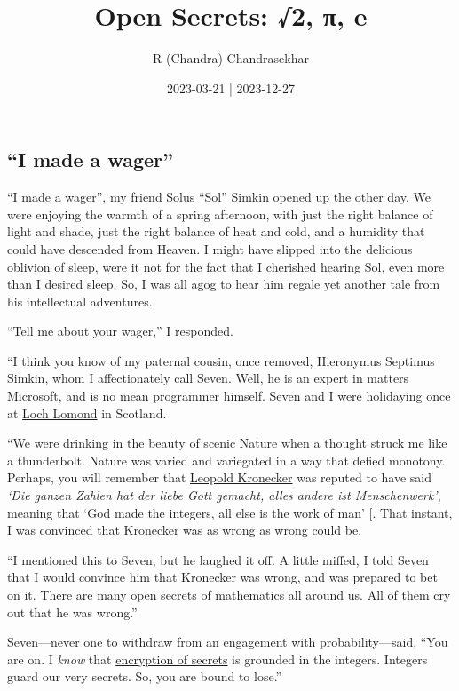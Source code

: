 \documentclass[
  a4paper,
]{article}
\title{Open Secrets: √2, π, e}
\author{R (Chandra) Chandrasekhar}
\date{2023-03-21 | 2023-12-27}
\begin{document}
\maketitle

\thispagestyle{empty}


\subsection{``I made a wager''}\label{i-made-a-wager}

``I made a wager'', my friend Solus ``Sol'' Simkin opened up the other
day. We were enjoying the warmth of a spring afternoon, with just the
right balance of light and shade, just the right balance of heat and
cold, and a humidity that could have descended from Heaven. I might have
slipped into the delicious oblivion of sleep, were it not for the fact
that I cherished hearing Sol, even more than I desired sleep. So, I was
all agog to hear him regale yet another tale from his intellectual
adventures.

``Tell me about your wager,'' I responded.

``I think you know of my paternal cousin, once removed, Hieronymus
Septimus Simkin, whom I affectionately call Seven. Well, he is an expert
in matters Microsoft, and is no mean programmer himself. Seven and I
were holidaying once at
\href{https://www.nationalparks.uk/park/loch-lomond-the-trossachs/}{Loch
Lomond} in Scotland.

``We were drinking in the beauty of scenic Nature when a thought struck
me like a thunderbolt. Nature was varied and variegated in a way that
defied monotony. Perhaps, you will remember that
\href{https://en.wikipedia.org/wiki/Leopold_Kronecker}{Leopold
Kronecker} was reputed to have said \emph{`Die ganzen Zahlen hat der
liebe Gott gemacht, alles andere ist Menschenwerk'}, meaning that `God
made the integers, all else is the work of man'
{[}\citeproc{ref-kronecker}{1}{]}. That instant, I was convinced that
Kronecker was as wrong as wrong could be.

``I mentioned this to Seven, but he laughed it off. A little miffed, I
told Seven that I would convince him that Kronecker was wrong, and was
prepared to bet on it. There are many open secrets of mathematics all
around us. All of them cry out that he was wrong.''

Seven---never one to withdraw from an engagement with
probability---said, ``You are on. I \emph{know} that
\href{https://cloud.google.com/learn/what-is-encryption}{encryption of
secrets} is grounded in the integers. Integers guard our very secrets.
So, you are bound to lose.''
\end{document}
